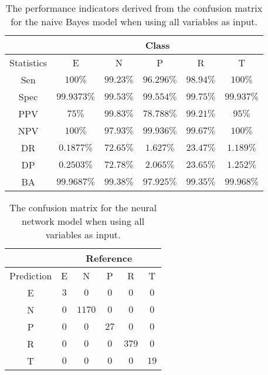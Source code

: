 \begin{table}[!ht]
	\centering
	\begin{tabular}{|c|c|c|c|c|c|}
		\hline
		 & \multicolumn{5}{c|}{Class} \\ \hline
		Statistics & E & N & P & R & T \\ \hline
		Sen & $100\%$ & $99.23\%$ & $96.296\%$ & $98.94\%$ & $100\%$ \\ \hline
		Spec & $99.9373\%$ & $99.53\%$ & $99.554\%$ & $99.75\%$ & $99.937\%$ \\ \hline
		PPV & $75\%$ & $99.83\%$ & $78.788\%$ & $99.21\%$ & $95\%$ \\ \hline
		NPV & $100\%$ & $97.93\%$ & $99.936\%$ & $99.67\%$ & $100\%$ \\ \hline
		DR & $0.1877\%$ & $72.65\%$ & $1.627\%$ & $23.47\%$ & $1.189\%$ \\ \hline
		DP & $0.2503\%$ & $72.78\%$ & $2.065\%$ & $23.65\%$ & $1.252\%$ \\ \hline
		BA & $99.9687\%$ & $99.38\%$ & $97.925\%$ & $99.35\%$ & $99.968\%$ \\ \hline
	\end{tabular}
	\caption{The performance indicators derived from the confusion matrix for the naive Bayes model when using all variables as input.}
	\label{tab:cs:reverse:all:nb}
\end{table}

\begin{table}[!ht]
	\centering
	\begin{tabular}{|c|c|c|c|c|c|}
		\hline
		 & \multicolumn{5}{|c|}{Reference} \\ \hline
		 Prediction & E & N & P & R & T \\ \hline
		 E & $3$ & $0$ & $0$ & $0$ & $0$ \\ \hline
		 N & $0$ & $1170$ & $0$ & $0$ & $0$ \\ \hline
		 P & $0$ & $0$ & $27$ & $0$ & $0$ \\ \hline
		 R & $0$ & $0$ & $0$ & $379$ & $0$ \\ \hline
		 T & $0$ & $0$ & $0$ & $0$ & $19$ \\ \hline
	\end{tabular}
	\caption{The confusion matrix for the neural network model when using all variables as input.}
	\label{tab:cm:all:nnet}
\end{table}


